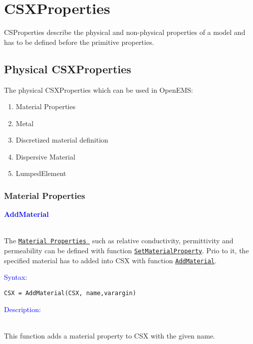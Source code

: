 \section{CSXProperties}\label{csx_prop} 
CSProperties describe the physical and non-physical properties of a model and has to be defined before the primitive properties. 

\subsection{Physical CSXProperties}
The physical CSXProperties which can be used in OpenEMS: 
 
\begin{enumerate}
\item Material Properties
\item Metal
\item Discretized material definition 
\item Dispersive Material
\item LumpedElement
\end{enumerate}

\subsubsection{Material Properties}

\textcolor{blue}{\begin{large}\textbf{AddMaterial}\end{large}}\\
The {\hyperref[para:Material Properties ]{\texttt{Material Properties }}} such as relative conductivity, permittivity and permeability can be defined with function \hyperref[para:SetMaterialProperty]{\texttt{SetMaterialProperty}}. Prio to it, the specified material has to added into CSX with function \hyperref[para:AddMaterial]{\texttt{AddMaterial}}.\\

\textcolor{blue}{\begin{large}Syntax:\end{large}}
 \begin{lstlisting}
CSX = AddMaterial(CSX, name,varargin)
 \end{lstlisting}
 
 \textcolor{blue}{\begin{large}Description:\end{large}}\\
  This function adds a material property to CSX with the given name.
  
